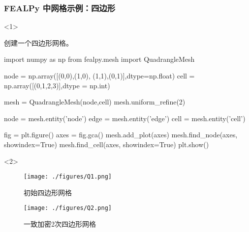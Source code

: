 \documentclass{beamer}
\numberwithin{subsection}{section}
\begin{document}
\begin{frame}[fragile]
    \frametitle{FEALPy 中网格示例：四边形}
\begin{onlyenv}<1>
	\begin{listing}[H]
	 \tiny
     \caption{创建一个四边形网格。}
	 \begin{pythoncode}
import numpy as np
from fealpy.mesh import QuadrangleMesh

node = np.array([(0,0),(1,0), (1,1),(0,1)],dtype=np.float)
cell = np.array([(0,1,2,3)],dtype = np.int)

mesh = QuadrangleMesh(node,cell)
mesh.uniform_refine(2)

node = mesh.entity('node')
edge = mesh.entity('edge')
cell = mesh.entity('cell')

fig = plt.figure()
axes = fig.gca()
mesh.add_plot(axes)
mesh.find_node(axes, showindex=True)
mesh.find_cell(axes, showindex=True)
plt.show()
	 \end{pythoncode}     
	\end{listing}
\end{onlyenv}
\begin{onlyenv}<2>
\begin{figure}[H]
	\begin{minipage}[t]{0.49\linewidth}
	\centering
    \texttt{[image: ./figures/Q1.png]}
    \caption{初始四边形网格}
	\end{minipage}
	\hfill
	\begin{minipage}[t]{0.49\linewidth}
	\centering
    \texttt{[image: ./figures/Q2.png]}
    \caption{一致加密2次四边形网格}
	\end{minipage}	
\end{figure}
\end{onlyenv}
\end{frame}
\end{document}
